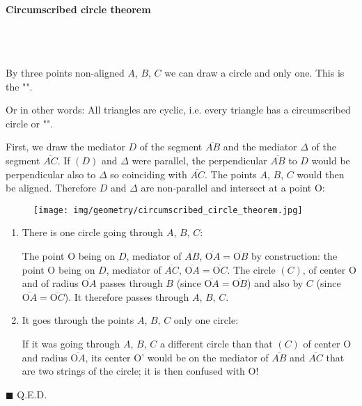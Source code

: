 	\pagebreak
	\paragraph{Circumscribed circle theorem}\mbox{}\\\\
	\begin{theorem}
	By three points non-aligned $A$, $B$, $C$ we can draw a circle and only one. This is the "".
	
	Or in other words: All triangles are cyclic, i.e. every triangle has a circumscribed circle or "".
	\end{theorem}
	\begin{dem}
	 First, we draw the mediator $D$ of  the segment  $\overline{AB} $ and the mediator $\Delta$ of  the segment $\overline{AC}$. If $(D)$ and $\Delta$ were parallel, the perpendicular $\overline{AB}$ to $D$ would be perpendicular also to $\Delta$ so coinciding with $\overline{AC}$. The points $A$, $B$, $C$ would then be aligned. Therefore $D$ and $\Delta$ are non-parallel and intersect at a point O:
	\begin{figure}[H]
		\centering
		\texttt{[image: img/geometry/circumscribed\_circle\_theorem.jpg]}
	\end{figure}
	\begin{enumerate}
		\item There is one circle going through $A$, $B$, $C$:

		The point O being on $D$, mediator of $\overline{AB}$, $\overline{\text{O}A} = \overline{\text{O}B}$ by construction:  the point O being on $D$, mediator of $\overline{AC}$, $\overline{\text{O}A} = \overline{\text{O}C}$. The circle $(C)$, of center O and of radius $\overline{\text{O}A}$ passes through $B$ (since  $\overline{\text{O}A} = \overline{\text{O}B}$) and also by $C$ (since $\overline{\text{O}A} = \overline{\text{O}C}$). It therefore passes through $A$, $B$, $C$.

		\item It goes through the points $A$, $B$, $C$ only one circle: 

		If it was going through $A$, $B$, $C$ a different circle than that $(C)$ of center O and radius $\overline{\text{O}A}$, its center O' would be on the mediator of $\overline{AB}$ and $\overline{AC}$ that are two strings of the circle; it is then confused with O!
	\end{enumerate}
	\begin{flushright}
		$\blacksquare$  Q.E.D.
	\end{flushright}
	\end{dem}
